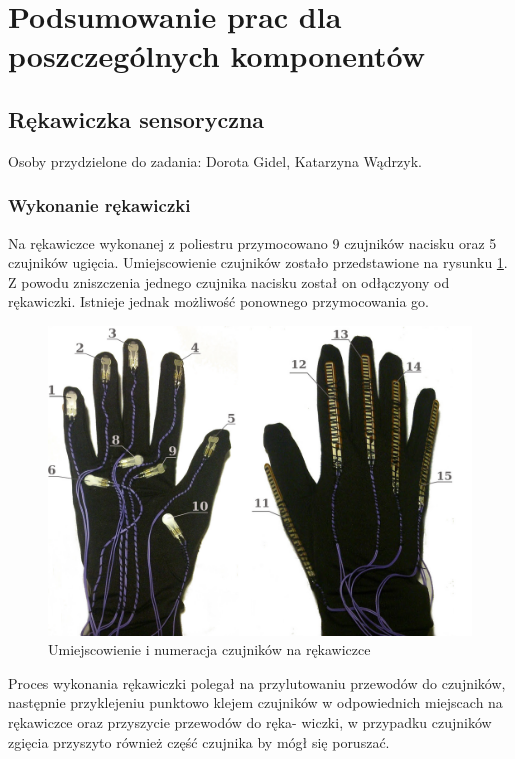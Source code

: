 \documentclass{article}
\begin{document}
\section{Podsumowanie prac dla poszczególnych komponentów}

\subsection{Rękawiczka sensoryczna}
Osoby przydzielone do zadania: Dorota Gidel, Katarzyna Wądrzyk.
\subsubsection{Wykonanie rękawiczki}

Na rękawiczce wykonanej z poliestru przymocowano 9 czujników nacisku oraz 5 czujników ugięcia. Umiejscowienie czujników zostało przedstawione na rysunku \ref{rys:czujniki_numeracja}. Z powodu zniszczenia jednego czujnika nacisku został on odłączyony od rękawiczki. Istnieje jednak możliwość ponownego przymocowania go.\\
\begin{figure}[H]
    \centering
    \includegraphics[width=14cm]{rekawiczka_umiejscowienie.jpg}
    \caption{Umiejscowienie i numeracja czujników na rękawiczce}
    \label{rys:czujniki_numeracja}
\end{figure}
Proces wykonania rękawiczki polegał na przylutowaniu przewodów do czujników, następnie przyklejeniu
punktowo klejem czujników w odpowiednich miejscach na rękawiczce oraz przyszycie przewodów do ręka-
wiczki, w przypadku czujników zgięcia przyszyto również część czujnika by mógł się poruszać.\\
\end{document}
